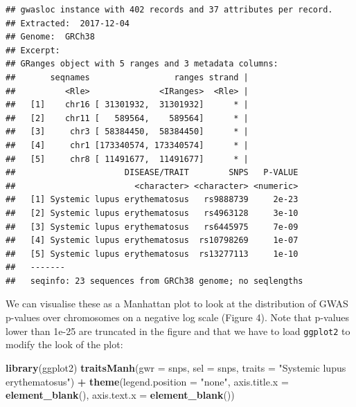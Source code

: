 \documentclass[9pt,a4paper,]{extarticle}
\newenvironment{Shaded}{\begin{snugshade}}{\end{snugshade}}
\newcommand{\KeywordTok}[1]{\textcolor[rgb]{0.13,0.29,0.53}{\textbf{#1}}}
\newcommand{\DataTypeTok}[1]{\textcolor[rgb]{0.13,0.29,0.53}{#1}}
\newcommand{\StringTok}[1]{\textcolor[rgb]{0.31,0.60,0.02}{#1}}
\newcommand{\OperatorTok}[1]{\textcolor[rgb]{0.81,0.36,0.00}{\textbf{#1}}}
\newcommand{\NormalTok}[1]{#1}
\begin{document}
\begin{verbatim}
## gwasloc instance with 402 records and 37 attributes per record.
## Extracted:  2017-12-04 
## Genome:  GRCh38 
## Excerpt:
## GRanges object with 5 ranges and 3 metadata columns:
##       seqnames                 ranges strand |
##          <Rle>              <IRanges>  <Rle> |
##   [1]    chr16 [ 31301932,  31301932]      * |
##   [2]    chr11 [   589564,    589564]      * |
##   [3]     chr3 [ 58384450,  58384450]      * |
##   [4]     chr1 [173340574, 173340574]      * |
##   [5]     chr8 [ 11491677,  11491677]      * |
##                      DISEASE/TRAIT        SNPS   P-VALUE
##                        <character> <character> <numeric>
##   [1] Systemic lupus erythematosus   rs9888739     2e-23
##   [2] Systemic lupus erythematosus   rs4963128     3e-10
##   [3] Systemic lupus erythematosus   rs6445975     7e-09
##   [4] Systemic lupus erythematosus  rs10798269     1e-07
##   [5] Systemic lupus erythematosus  rs13277113     1e-10
##   -------
##   seqinfo: 23 sequences from GRCh38 genome; no seqlengths
\end{verbatim}

We can visualise these as a Manhattan plot to look at the distribution of GWAS p-values over chromosomes on a negative log scale (Figure 4).
Note that p-values lower than 1e-25 are truncated in the figure and that we have to load \texttt{ggplot2} \citep{Wickham2009} to modify the look of the plot:

\begin{Shaded}
\begin{Highlighting}[]
\KeywordTok{library}\NormalTok{(ggplot2)}
\KeywordTok{traitsManh}\NormalTok{(}\DataTypeTok{gwr =}\NormalTok{ snps, }\DataTypeTok{sel =}\NormalTok{ snps, }\DataTypeTok{traits =} \StringTok{"Systemic lupus erythematosus"}\NormalTok{) }\OperatorTok{+}
\StringTok{  }\KeywordTok{theme}\NormalTok{(}\DataTypeTok{legend.position =} \StringTok{"none"}\NormalTok{,}
        \DataTypeTok{axis.title.x =} \KeywordTok{element_blank}\NormalTok{(),}
        \DataTypeTok{axis.text.x =} \KeywordTok{element_blank}\NormalTok{())}
\end{Highlighting}
\end{Shaded}
\end{document}

